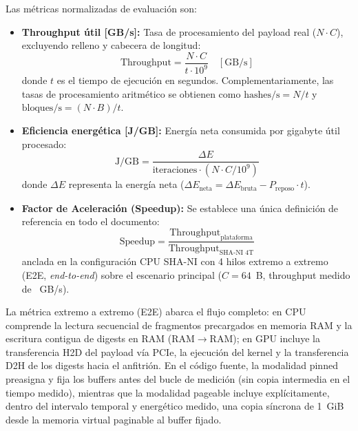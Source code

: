 \documentclass[conference]{IEEEtran}
\begin{document}
Las métricas normalizadas de evaluación son:
\begin{itemize}
    \item \textbf{Throughput útil [GB/s]:} Tasa de procesamiento del payload real ($N \cdot C$), excluyendo relleno y cabecera de longitud:
    \begin{equation}
        \text{Throughput} = \frac{N \cdot C}{t \cdot 10^{9}} \quad [\text{GB/s}]
        \label{eq:throughput}
    \end{equation}
    donde $t$ es el tiempo de ejecución en segundos. Complementariamente, las tasas de procesamiento aritmético se obtienen como $\text{hashes/s} = N/t$ y $\text{bloques/s} = (N \cdot B)/t$.
    
    \item \textbf{Eficiencia energética [J/GB]:} Energía neta consumida por gigabyte útil procesado:
    \begin{equation}
        \text{J/GB} = \frac{\Delta E}{\text{iteraciones} \cdot (N \cdot C / 10^{9})}
        \label{eq:jgb}
    \end{equation}
    donde $\Delta E$ representa la energía neta ($\Delta E_\text{neta} = \Delta E_\text{bruta} - P_\text{reposo} \cdot t$).

    \item \textbf{Factor de Aceleración (Speedup):} Se establece una única definición de referencia en todo el documento:
    \begin{equation}
        \text{Speedup} = \frac{\text{Throughput}_\text{plataforma}}{\text{Throughput}_\text{SHA-NI 4T}}
        \label{eq:speedup}
    \end{equation}
    anclada en la configuración CPU SHA-NI con 4 hilos extremo a extremo (E2E, \textit{end-to-end}) sobre el escenario principal ($C = 64$~B, throughput medido de \macrocputputfour~GB/s).
\end{itemize}

La métrica extremo a extremo (E2E) abarca el flujo completo: en CPU comprende la lectura secuencial de fragmentos precargados en memoria RAM y la escritura contigua de digests en RAM (RAM$\to$RAM); en GPU incluye la transferencia H2D del payload vía PCIe, la ejecución del kernel y la transferencia D2H de los digests hacia el anfitrión. En el código fuente, la modalidad pinned preasigna y fija los buffers antes del bucle de medición (sin copia intermedia en el tiempo medido), mientras que la modalidad pageable incluye explícitamente, dentro del intervalo temporal y energético medido, una copia síncrona de 1~GiB desde la memoria virtual paginable al buffer fijado.
\end{document}
